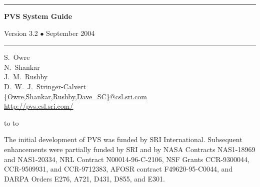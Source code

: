 \documentclass[12pt]{book}
\begin{document}
\begin{titlepage}
\vspace*{1in}
\noindent
\rule[1pt]{\textwidth}{2pt}
\begin{center}
\textbf{\pvstitle PVS System Guide}
\end{center}
\begin{flushright}
{\Large Version 3.2 {\smaller$\bullet$} September 2004}
\end{flushright}
\rule[1in]{\textwidth}{2pt}
\vspace*{2in}
\begin{flushleft}
S.~Owre\\
N.~Shankar\\
J.~M.~Rushby\\
D.~W.~J.~Stringer-Calvert\\
{\smaller\url{{Owre,Shankar,Rushby,Dave_SC}@csl.sri.com}}\\
{\smaller\url{http://pvs.csl.sri.com/}}
\end{flushleft}
\vspace*{1in}
\vbox{\hbox to %
\hbox to }
\end{titlepage}

\pagestyle{fancy}
\renewcommand{\chaptermark}[1]
  {\markboth{\thechapter\quad\em #1}{\thechapter\quad\em #1}}
\renewcommand{\sectionmark}[1]
  {\markboth{\thesection\quad\em #1}{\thesection\quad\em #1}}
\lhead[\thepage]{\rightmark}
\cfoot{}
\rhead[\leftmark]{\thepage}
\thispagestyle{empty}

\newpage
\vspace*{6in}\noindent
The initial development of PVS was funded by SRI International.
Subsequent enhancements were partially funded by SRI and by NASA
Contracts NAS1-18969 and NAS1-20334, NRL Contract N00014-96-C-2106,
NSF Grants CCR-9300044, CCR-9509931, and CCR-9712383, AFOSR contract
F49620-95-C0044, and DARPA Orders E276, A721, D431, D855, and E301.
\newpage\setcounter{page}{1}

\tableofcontents


\end{document}
